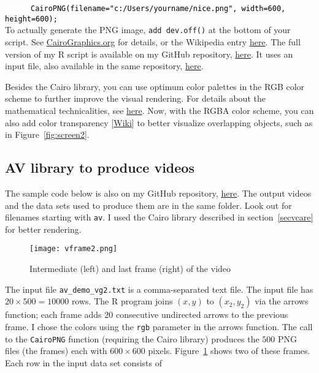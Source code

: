 \documentclass[oneside,10pt]{book}
\begin{document}
\noindent \textcolor{white}{000000}\texttt{\textcolor{black}{CairoPNG(filename="c:/Users/yourname/nice.png", width=600, height=600);}} \\

\noindent To actually generate the PNG image, \texttt{add dev.off()} at the bottom of your script. See \href{https://www.cairographics.org/}{CairoGraphics.org} for details, or the Wikipedia entry \href{https://en.wikipedia.org/wiki/Cairo_(graphics)}{here}. 
The full version of my R script is available on my GitHub repository, \href{https://github.com/VincentGranville/Point-Processes/blob/main/Source\%20Code/PP_NN_arrows.r}{here}. It uses an input file, also available in the same repository, \href{https://github.com/VincentGranville/Point-Processes/blob/main/Data/PB_r.txt}{here}.



Besides the Cairo library, you can use optimum \textcolor{index}{color palettes} in the 
 \textcolor{index}{RGB color scheme} to further improve the visual rendering. For details about the mathematical technicalities,
 see \href{https://mathoverflow.net/questions/415618/lattice-like-structure-with-maximum-spacing-between-vertices}{here}.  
Now, with the \textcolor{index}{RGBA color scheme}, you can also add \textcolor{index}{color transparency} [\href{https://en.wikipedia.org/wiki/Alpha_compositing}{Wiki}] to better visualize
 overlapping objects, such as in Figure~\ref{fig:screen2}.

\subsection{AV library to produce videos}

The sample code below is also on my GitHub repository, \href{https://github.com/VincentGranville/Point-Processes/tree/main/Videos}{here}. The output videos and the data sets used to produce  them are in the same folder. Look out for filenames
 starting with \texttt{av}.  I used the Cairo library described in section~\ref{secvcare} for better rendering.


\begin{figure}%
\centering
\texttt{[image: vframe2.png]} %
\caption{Intermediate (left) and last frame (right) of the video}
\label{fig:vfr2}
\end{figure}

The input file \texttt{av\_demo\_vg2.txt} is a comma-separated text file. The input file has $20 \times 500 = \num{10000}$ rows. The R program joins $(x, y)$ to $(x_2, y_2)$ via the arrows function; each frame adds $20$ consecutive undirected arrows to the previous frame. I chose the colors using the \texttt{rgb} parameter in the arrows function. The call to the 
\texttt{CairoPNG} function (requiring the Cairo library) produces the $500$ PNG files (the frames) each with 
$600 \times 600$ pixels. Figure~\ref{fig:vfr2} shows two of these frames. Each row in the input data set consists of
\end{document}
